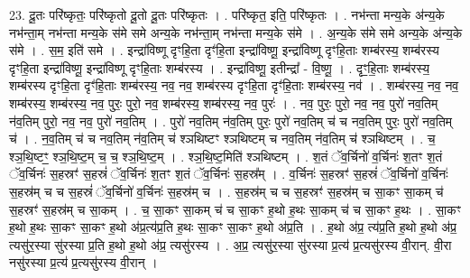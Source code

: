 \documentclass[17pt]{extarticle}
\begin{document}
23. दू॒तः परि॑ष्कृतः॒ परि॑ष्कृतो दू॒तो दू॒तः परि॑ष्कृतः । . परि॑ष्कृत॒ इति॒ परि॑ष्कृतः । . नभ॑न्ता मन्य॒के अ॑न्य॒के नभ॑न्ता॒म् नभ॑न्ता मन्य॒के स॑मे समे अन्य॒के नभ॑न्ता॒म् नभ॑न्ता मन्य॒के स॑मे । . अ॒न्य॒के स॑मे समे अन्य॒के अ॑न्य॒के स॑मे । . स॒म॒ इति॑ समे । . इन्द्रा॑विष्णू दृꣳहि॒ता दृꣳ॑हि॒ता इन्द्रा॑विष्णू॒ इन्द्रा॑विष्णू दृꣳहि॒ताः शम्ब॑रस्य॒ शम्ब॑रस्य दृꣳहि॒ता इन्द्रा॑विष्णू॒ इन्द्रा॑विष्णू दृꣳहि॒ताः शम्ब॑रस्य । . इन्द्रा॑विष्णू॒ इतीन्द्रा᳚ - वि॒ष्णू॒ । . दृꣳ॒॒हि॒ताः शम्ब॑रस्य॒ शम्ब॑रस्य दृꣳहि॒ता दृꣳ॑हि॒ताः शम्ब॑रस्य॒ नव॒ नव॒ शम्ब॑रस्य दृꣳहि॒ता दृꣳ॑हि॒ताः शम्ब॑रस्य॒ नव॑ । . शम्ब॑रस्य॒ नव॒ नव॒ शम्ब॑रस्य॒ शम्ब॑रस्य॒ नव॒ पुरः॒ पुरो॒ नव॒ शम्ब॑रस्य॒ शम्ब॑रस्य॒ नव॒ पुरः॑ । . नव॒ पुरः॒ पुरो॒ नव॒ नव॒ पुरो॑ नव॒तिम् न॑व॒तिम् पुरो॒ नव॒ नव॒ पुरो॑ नव॒तिम् । . पुरो॑ नव॒तिम् न॑व॒तिम् पुरः॒ पुरो॑ नव॒तिम् च॑ च नव॒तिम् पुरः॒ पुरो॑ नव॒तिम् च॑ । . न॒व॒तिम् च॑ च नव॒तिम् न॑व॒तिम् च॑ श्ञथिष्टꣳ श्ञथिष्टम् च नव॒तिम् न॑व॒तिम् च॑ श्ञथिष्टम् । . च॒ श्ञ॒थि॒ष्टꣳ॒॒ श्ञ॒थि॒ष्ट॒म् च॒ च॒ श्ञ॒थि॒ष्ट॒म् । . श्ञ॒थि॒ष्ट॒मिति॑ श्ञथिष्टम् । . श॒तं ॅव॒र्चिनो॑ व॒र्चिनः॑ श॒तꣳ श॒तं ॅव॒र्चिनः॑ स॒हस्रꣳ॑ स॒हस्रं॑ ॅव॒र्चिनः॑ श॒तꣳ श॒तं ॅव॒र्चिनः॑ स॒हस्र᳚म् । . व॒र्चिनः॑ स॒हस्रꣳ॑ स॒हस्रं॑ ॅव॒र्चिनो॑ व॒र्चिनः॑ स॒हस्र॑म् च च स॒हस्रं॑ ॅव॒र्चिनो॑ व॒र्चिनः॑ स॒हस्र॑म् च । . स॒हस्र॑म् च च स॒हस्रꣳ॑ स॒हस्र॑म् च सा॒कꣳ सा॒कम् च॑ स॒हस्रꣳ॑ स॒हस्र॑म् च सा॒कम् । . च॒ सा॒कꣳ सा॒कम् च॑ च सा॒कꣳ ह॒थो ह॒थः सा॒कम् च॑ च सा॒कꣳ ह॒थः । . सा॒कꣳ ह॒थो ह॒थः सा॒कꣳ सा॒कꣳ ह॒थो अ॑प्र॒त्य॑प्र॒ति ह॒थः सा॒कꣳ सा॒कꣳ ह॒थो अ॑प्र॒ति । . ह॒थो अ॑प्र॒ त्य॑प्र॒ति ह॒थो ह॒थो अ॑प्र॒ त्यसु॑र॒स्या सु॑रस्या प्र॒ति ह॒थो ह॒थो अ॑प्र॒ त्यसु॑रस्य । . अ॒प्र॒ त्यसु॑र॒स्या सु॑रस्या प्र॒त्य॑ प्र॒त्यसु॑रस्य वी॒रान्. वी॒रा नसु॑रस्या प्र॒त्य॑ प्र॒त्यसु॑रस्य वी॒रान् । \newline
\end{document}
